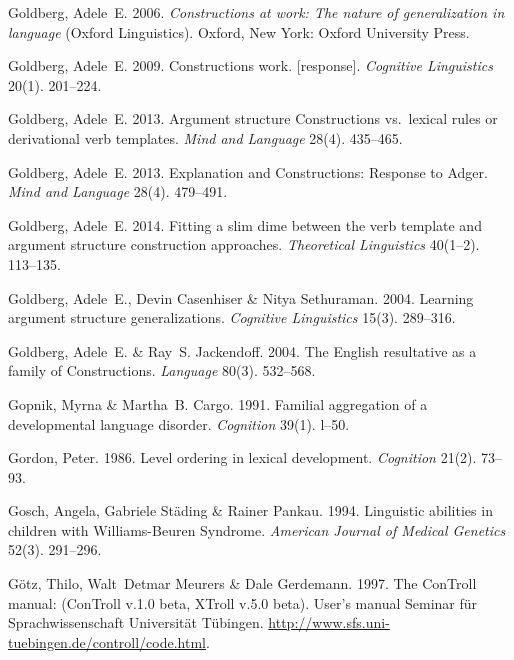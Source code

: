 \begin{thebibliography}{1420}
Goldberg, Adele~E. 2006.
\newblock \emph{Constructions at work: {The} nature of generalization in
  language}  (Oxford Linguistics).
\newblock Oxford, New York: Oxford University Press.

Goldberg, Adele~E. 2009.
\newblock Constructions work. [response].
\newblock \emph{Cognitive Linguistics} 20(1). 201--224.

Goldberg, Adele~E. 2013{}.
\newblock Argument structure {Constructions} vs.\ lexical rules or derivational
  verb templates.
\newblock \emph{Mind and Language} 28(4). 435--465.

Goldberg, Adele~E. 2013{}.
\newblock Explanation and {Constructions}: {Response} to {Adger}.
\newblock \emph{Mind and Language} 28(4). 479--491.

Goldberg, Adele~E. 2014.
\newblock Fitting a slim dime between the verb template and argument structure
  construction approaches.
\newblock \emph{Theoretical Linguistics} 40(1--2). 113--135.

Goldberg, Adele~E., Devin Casenhiser \& Nitya Sethuraman. 2004.
\newblock Learning argument structure generalizations.
\newblock \emph{Cognitive Linguistics} 15(3). 289--316.

Goldberg, Adele~E. \& Ray~S. Jackendoff. 2004.
\newblock The {English} resultative as a family of {Constructions}.
\newblock \emph{Language} 80(3). 532--568.

Gopnik, Myrna \& Martha~B. Cargo. 1991.
\newblock Familial aggregation of a developmental language disorder.
\newblock \emph{Cognition} 39(1). l--50.

Gordon, Peter. 1986.
\newblock Level ordering in lexical development.
\newblock \emph{Cognition} 21(2). 73--93.

Gosch, Angela, Gabriele St{\"a}ding \& Rainer Pankau. 1994.
\newblock Linguistic abilities in children with {Williams-Beuren Syndrome}.
\newblock \emph{American Journal of Medical Genetics} 52(3). 291--296.

G{\"o}tz, Thilo, Walt~Detmar Meurers \& Dale Gerdemann. 1997.
\newblock The {ConTroll} manual: {(ConTroll v.1.0 beta, XTroll v.5.0 beta)}.
\newblock User's manual Seminar f{\"u}r Sprachwissenschaft Universit{\"a}t
  T{\"u}bingen.
\newblock \urlprefix\url{http://www.sfs.uni-tuebingen.de/controll/code.html}.


\end{thebibliography}
